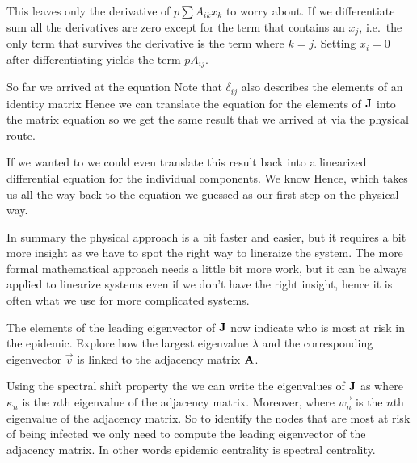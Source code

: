 This leaves only the derivative of $p\sum A_{ik} x_k$ to worry about. 
If we differentiate sum all the derivatives are zero except for the term that contains an $x_j$, i.e.~the only term that survives the derivative is the term where $k=j$. Setting $x_i=0$ after differentiating yields the term $pA_{ij}$. 

So far we arrived at the equation 
Note that $\delta_{ij}$ also describes the elements of an identity matrix
Hence we can translate the equation for the elements of $\bf J$ into the matrix equation 
so we get the same result that we arrived at via the physical route.

If we wanted to we could even translate this result back into a linearized differential equation for the individual components. We know 
Hence,
which takes us all the way back to the equation we guessed as our first step on the physical way.  

In summary the physical approach is a bit faster and easier, but it requires a bit more insight as we have to spot the right way to lineraize the system. The more formal mathematical approach needs a little bit more work, but it can be always applied to linearize systems even if we don't have the right insight, hence it is often what we use for more complicated systems. 

\subquestion 
The elements of the leading eigenvector of $\bf J$ now indicate who is most at risk in the epidemic. Explore how the largest eigenvalue $\lambda$ and the corresponding eigenvector $\vec{v}$ is linked to the adjacency matrix $\bf A$. 

\solution Using the spectral shift property the we can write the eigenvalues of $\bf J$ as
where $\kappa_n$ is the $n$th eigenvalue of the adjacency matrix. Moreover, 
where $\vec{w_n}$ is the $n$th eigenvalue of the adjacency matrix. 
So to identify the nodes that are most at risk of being infected we only need to compute the leading eigenvector of the adjacency matrix. In other words epidemic centrality is spectral centrality. 

